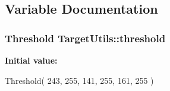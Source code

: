 \subsection{\-Variable \-Documentation}
\hypertarget{namespace_target_utils_a947bbb5e94ef4920376ed9e3ba7349c6}{
\subsubsection[{threshold}]{\setlength{\rightskip}{0pt plus 5cm}\-Threshold {\bf \-Target\-Utils\-::threshold}}}\label{namespace_target_utils_a947bbb5e94ef4920376ed9e3ba7349c6}
{\bfseries \-Initial value\-:}
\begin{DoxyCode}
 Threshold(
                        243,                            
                        255,                            
                        141,                            
                        255,                            
                        161,                            
                        255                                     
        )
\end{DoxyCode}
